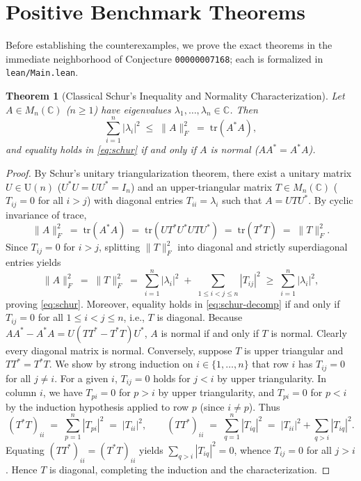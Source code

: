 \documentclass[11pt,a4paper]{article}
\theoremstyle{plain}
\newtheorem{theorem}{Theorem}[section]
\theoremstyle{definition}
\newcommand{\C}{\mathbb{C}}
\newcommand{\tr}{\mathrm{tr}}
\newcommand{\Un}{\mathrm{U}}
\begin{document}
\section{Positive Benchmark Theorems}

Before establishing the counterexamples, we prove the exact theorems in the immediate neighborhood of Conjecture \texttt{00000007168}; each is formalized in \texttt{lean/Main.lean}.

\begin{theorem}[Classical Schur's Inequality and Normality Characterization]\label{thm:schur}
Let $A \in M_n(\C)$ ($n \ge 1$) have eigenvalues $\lambda_1, \dots, \lambda_n \in \C$. Then
\begin{equation}\label{eq:schur}
  \sum_{i=1}^n |\lambda_i|^2 \;\le\; \|A\|_F^2 \;=\; \tr(A^* A),
\end{equation}
and equality holds in \eqref{eq:schur} if and only if $A$ is normal ($A A^* = A^* A$).
\end{theorem}

\begin{proof}
By Schur's unitary triangularization theorem, there exist a unitary matrix $U \in \Un(n)$ ($U^* U = U U^* = I_n$) and an upper-triangular matrix $T \in M_n(\C)$ ($T_{ij} = 0$ for all $i > j$) with diagonal entries $T_{ii} = \lambda_i$ such that $A = U T U^*$. By cyclic invariance of trace,
\[
  \|A\|_F^2 \;=\; \tr(A^* A) \;=\; \tr(U T^* U^* U T U^*) \;=\; \tr(T^* T) \;=\; \|T\|_F^2.
\]
Since $T_{ij} = 0$ for $i > j$, splitting $\|T\|_F^2$ into diagonal and strictly superdiagonal entries yields
\begin{equation}\label{eq:schur-decomp}
  \|A\|_F^2 \;=\; \|T\|_F^2 \;=\; \sum_{i=1}^n |\lambda_i|^2 \;+\; \sum_{1 \le i < j \le n} |T_{ij}|^2 \;\ge\; \sum_{i=1}^n |\lambda_i|^2,
\end{equation}
proving \eqref{eq:schur}. Moreover, equality holds in \eqref{eq:schur-decomp} if and only if $T_{ij} = 0$ for all $1 \le i < j \le n$, i.e., $T$ is diagonal. Because $A A^* - A^* A = U(T T^* - T^* T)U^*$, $A$ is normal if and only if $T$ is normal. Clearly every diagonal matrix is normal. Conversely, suppose $T$ is upper triangular and $T T^* = T^* T$. We show by strong induction on $i \in \{1, \dots, n\}$ that row $i$ has $T_{ij} = 0$ for all $j \ne i$. For a given $i$, $T_{ij} = 0$ holds for $j < i$ by upper triangularity. In column $i$, we have $T_{pi} = 0$ for $p > i$ by upper triangularity, and $T_{pi} = 0$ for $p < i$ by the induction hypothesis applied to row $p$ (since $i \ne p$). Thus
\[
  (T^* T)_{ii} \;=\; \sum_{p=1}^n |T_{pi}|^2 \;=\; |T_{ii}|^2, \qquad
  (T T^*)_{ii} \;=\; \sum_{q=1}^n |T_{iq}|^2 \;=\; |T_{ii}|^2 + \sum_{q > i} |T_{iq}|^2.
\]
Equating $(T T^*)_{ii} = (T^* T)_{ii}$ yields $\sum_{q > i} |T_{iq}|^2 = 0$, whence $T_{ij} = 0$ for all $j > i$. Hence $T$ is diagonal, completing the induction and the characterization.
\end{proof}
\end{document}
